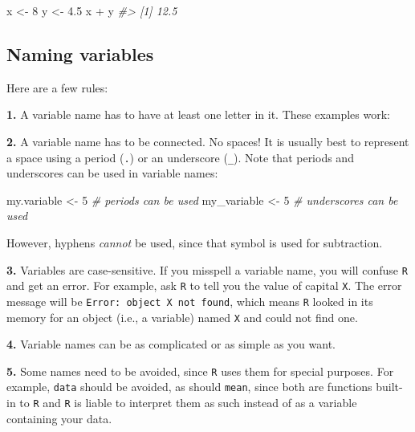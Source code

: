 \documentclass[
]{book}
\newenvironment{Shaded}{\begin{snugshade}}{\end{snugshade}}
\newcommand{\CommentTok}[1]{\textcolor[rgb]{0.56,0.35,0.01}{\textit{#1}}}
\newcommand{\DecValTok}[1]{\textcolor[rgb]{0.00,0.00,0.81}{#1}}
\newcommand{\FloatTok}[1]{\textcolor[rgb]{0.00,0.00,0.81}{#1}}
\newcommand{\NormalTok}[1]{#1}
\newcommand{\OtherTok}[1]{\textcolor[rgb]{0.56,0.35,0.01}{#1}}
\newcommand{\SpecialCharTok}[1]{\textcolor[rgb]{0.00,0.00,0.00}{#1}}
\begin{document}
\begin{Shaded}
\begin{Highlighting}[]
\NormalTok{x }\OtherTok{\textless{}{-}} \DecValTok{8}
\NormalTok{y }\OtherTok{\textless{}{-}} \FloatTok{4.5}
\NormalTok{x }\SpecialCharTok{+}\NormalTok{ y}
\CommentTok{\#\textgreater{} [1] 12.5}
\end{Highlighting}
\end{Shaded}

\hypertarget{naming-variables}{%
\subsection*{Naming variables}\label{naming-variables}}

Here are a few rules:

\textbf{1.} A variable name has to have at least one letter in it. These examples work:

\textbf{2.} A variable name has to be connected. No spaces! It is usually best to represent a space using a period (\texttt{.}) or an underscore (\texttt{\_}). Note that periods and underscores can be used in variable names:

\begin{Shaded}
\begin{Highlighting}[]
\NormalTok{my.variable }\OtherTok{\textless{}{-}} \DecValTok{5} \CommentTok{\# periods can be used}
\NormalTok{my\_variable }\OtherTok{\textless{}{-}} \DecValTok{5} \CommentTok{\# underscores can be used}
\end{Highlighting}
\end{Shaded}

However, hyphens \emph{cannot} be used, since that symbol is used for subtraction.

\textbf{3.} Variables are case-sensitive. If you misspell a variable name, you will confuse \texttt{R} and get an error. For example, ask \texttt{R} to tell you the value of capital \texttt{X}. The error message will be \texttt{Error:\ object\ \textquotesingle{}X\textquotesingle{}\ not\ found}, which means \texttt{R} looked in its memory for an object (i.e., a variable) named \texttt{X} and could not find one.

\textbf{4.} Variable names can be as complicated or as simple as you want.

\textbf{5.} Some names need to be avoided, since \texttt{R} uses them for special purposes. For example, \texttt{data} should be avoided, as should \texttt{mean}, since both are functions built-in to \texttt{R} and \texttt{R} is liable to interpret them as such instead of as a variable containing your data.
\end{document}
